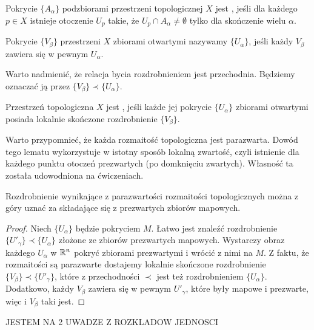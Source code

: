 \begin{definition} Pokrycie $\{A_\alpha\}$ podzbiorami przestrzeni topologicznej $X$ jest , jeśli dla każdego $p\in X$ istnieje otoczenie $U_p$ takie, że $U_p\cap A_\alpha\neq\emptyset$ tylko dla skończenie wielu $\alpha$.
\end{definition}

\begin{definition}[rozdrobnienie] Pokrycie $\{V_\beta\}$ przestrzeni $X$ zbiorami otwartymi nazywamy  $\{U_\alpha\}$, jeśli każdy $V_\beta$ zawiera się w pewnym $U_\alpha$.
\end{definition}

Warto nadmienić, że relacja bycia rozdrobnieniem jest przechodnia. Będziemy oznaczać ją przez $\{V_\beta\}\prec\{U_\alpha\}$.

\begin{definition} Przestrzeń topologiczna $X$ jest , jeśli każde jej pokrycie $\{U_\alpha\}$ zbiorami otwartymi posiada lokalnie skończone rozdrobnienie $\{V_\beta\}$.
\end{definition}

Warto przypomnieć, że każda rozmaitość topologiczna jest parazwarta. Dowód tego lematu wykorzystuje w istotny sposób lokalną zwartość, czyli istnienie dla każdego punktu otoczeń prezwartych (po domknięciu zwartych). Własność ta została udowodniona na ćwiczeniach.

\begin{remark}
Rozdrobnienie wynikające z parazwartości rozmaitości topologicznych można z góry uznać za składające się z prezwartych zbiorów mapowych.
\end{remark}

\begin{proof}
Niech $\{U_\alpha\}$ będzie pokryciem $M$. Łatwo jest znaleźć rozdrobnienie $\{U'_\gamma\}\prec\{U_\alpha\}$ złożone ze zbiorów prezwartych mapowych. Wystarczy obraz każdego $U_\alpha$ w $\mathbb{R}^n$ pokryć zbiorami prezwartymi i wrócić z nimi na $M$. Z faktu, że rozmaitości są parazwarte dostajemy lokalnie skończone rozdrobnienie $\{V_\beta\}\prec\{U'_\gamma\}$, które z przechodności $\prec$ jest też rozdrobnieniem $\{U_\alpha\}$. Dodatkowo, każdy $V_\beta$ zawiera się w pewnym $U'_\gamma$, które były mapowe i prezwarte, więc i $V_\beta$ taki jest.
\end{proof}

{\large\color{red}JESTEM NA 2 UWADZE Z ROZKLADOW JEDNOSCI}
